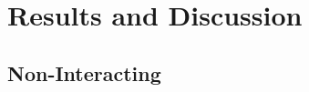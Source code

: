 \section{Results and Discussion}\label{sec:Results}

\subsection{Non-Interacting}\label{sec:project results}


